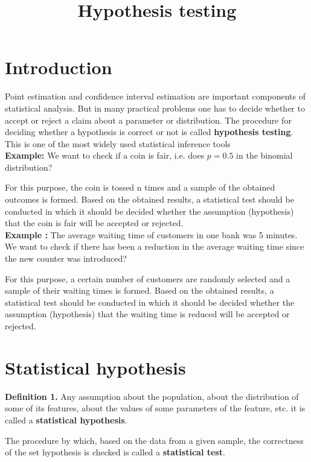 \documentclass[a4paper, 12pt]{article}
\title{
  \vspace{-1.5cm}
  \textbf{Hypothesis testing}
  \vspace{-1.5cm}
}
\date{}
\begin{document}
\maketitle

\section{Introduction}
Point estimation and confidence interval estimation are important components of statistical analysis. But in many practical problems one has to decide whether to accept or reject a claim about a parameter or distribution. The procedure for deciding whether a hypothesis is correct or not is called \textbf{hypothesis testing}. This is one of the most widely used statistical inference tools\\

\textbf{Example:} We want to check if a coin is fair, i.e. does $p = 0.5$ in the binomial
distribution?

For this purpose, the coin is tossed n times and a sample of the obtained
outcomes is formed. Based on the obtained results, a statistical test
should be conducted in which it should be decided whether the
assumption (hypothesis) that the coin is fair will be accepted or rejected. \\



\textbf{Example :} The average waiting time of customers in one bank was 5 minutes.
We want to check if there has been a reduction in the average waiting
time since the new counter was introduced?

For this purpose, a certain number of customers are randomly selected and a sample of their waiting times is formed. Based on the obtained results, a statistical test should be conducted in which it should be decided whether the assumption (hypothesis) that the waiting time is reduced will be accepted or rejected.




\section{Statistical hypothesis}

\textbf{Definition 1.} Any assumption about the population, about the distribution of some of its features, about the values of some parameters of the feature, etc. it is called a \textbf{statistical hypothesis}.


The procedure by which, based on the data from a given sample, the correctness of the set hypothesis is checked is called a \textbf{statistical test}.
\end{document}
